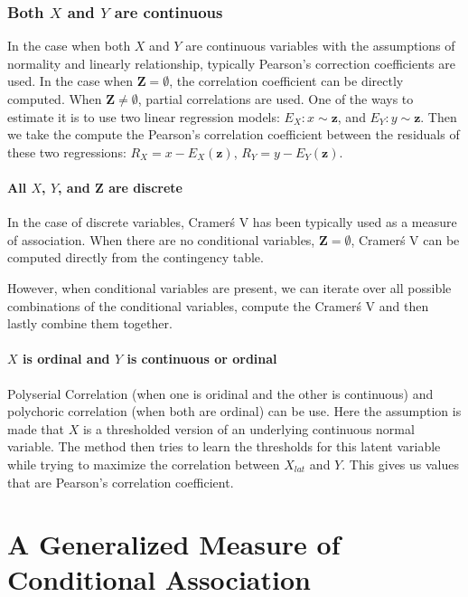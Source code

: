 \documentclass{uai2025} %
\begin{document}
\subsubsection{Both $ X $ and $ Y $ are continuous}
In the case when both $ X $ and $ Y $ are continuous variables with the
assumptions of normality and linearly relationship, typically Pearson's
correction coefficients are used. In the case when $ \bm{Z} = \emptyset $, the
correlation coefficient can be directly computed. When $ \bm{Z} \neq \emptyset
$, partial correlations are used. One of the ways to estimate it is to use two
linear regression models: $ E_X: x \sim \bm{z} $, and $ E_Y: y \sim \bm{z} $.
Then we take the compute the Pearson's correlation coefficient between the
residuals of these two regressions: $ R_X = x - E_X(\bm{z}) $, $ R_Y = y -
E_Y(\bm{z}) $.

\paragraph{All $ X $, $ Y $, and $ \bm{Z} $ are discrete}

In the case of discrete variables, Cramer\'s V has been typically used as a
measure of association. When there are no conditional variables, $ \bm{Z} =
\emptyset $, Cramer\'s V can be computed directly from the contingency table.

However, when conditional variables are present, we can iterate over all
possible combinations of the conditional variables, compute the Cramer\'s V and
then lastly combine them together. 

\paragraph{$ X $ is ordinal and $ Y $ is continuous or ordinal}
Polyserial Correlation (when one is oridinal and the other is continuous) and
polychoric correlation (when both are ordinal) can be use. Here the assumption
is made that $ X $ is a thresholded version of an underlying continuous normal
variable. The method then tries to learn the thresholds for this latent
variable while trying to maximize the correlation between $ X_{lat} $ and $ Y
$. This gives us values that are Pearson's correlation coefficient.

\section{A Generalized Measure of Conditional Association}
\label{sec:mixed_association}
\end{document}
